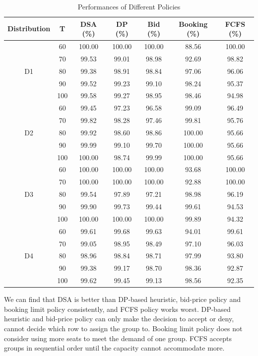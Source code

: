 \begin{table}[h]
  \centering
  \caption{Performances of Different Policies}
  \begin{tabular}{|c|c|c|c|c|c|c|}
  \hline
  Distribution & T & DSA (\%) & DP (\%) & Bid (\%) & Booking (\%) & FCFS (\%) \\
  \hline
  \multirow{5}{*}{D1} & 60 & 100.00 & 100.00 & 100.00 & 88.56 & 100.00 \\
  & 70    & 99.53 & 99.01 & 98.98 & 92.69 & 98.82 \\
  & 80    & 99.38 & 98.91 & 98.84 & 97.06 & 96.06 \\
  & 90    & 99.52 & 99.23 & 99.10 & 98.24 & 95.37 \\
  & 100   & 99.58 & 99.27 & 98.95 & 98.46 & 94.98 \\
  \hline
  \multirow{5}{*}{D2} & 60  & 99.45 & 97.23 & 96.58 & 99.09 & 96.49 \\
     & 70   & 99.82 & 98.28 & 97.46 & 99.81 & 95.76 \\
     & 80   & 99.92 & 98.60 & 98.86 & 100.00 & 95.66 \\
     & 90   & 99.99 & 99.10 & 99.70 & 100.00 & 95.66 \\
     & 100  & 100.00 & 98.74 & 99.99 & 100.00 & 95.66 \\
  \hline
  \multirow{5}{*}{D3} & 60  & 100.00 & 100.00 & 100.00 & 93.68 & 100.00 \\
     & 70  & 100.00 & 100.00 & 100.00 & 92.88 & 100.00 \\
     & 80  & 99.54 & 97.89 & 97.21 & 98.98 & 96.19 \\
     & 90  & 99.90 & 99.73 & 99.44 & 99.61 & 94.53 \\
     & 100 & 100.00 & 100.00 & 100.00 & 99.89 & 94.32 \\
  \hline
    \multirow{5}{*}{D4} & 60  & 99.61 & 99.68 & 99.63 & 94.01 & 99.61 \\
     & 70  & 99.05 & 98.95 & 98.49 & 97.10 & 96.03 \\
     & 80  & 98.96 & 98.84 & 98.71 & 97.99 & 93.80 \\
     & 90  & 99.38 & 99.17 & 98.70 & 98.36 & 92.87 \\
     & 100 & 99.62 & 99.45 & 99.13 & 98.56 & 92.35 \\
  \hline
  \end{tabular}
\end{table}

We can find that DSA is better than DP-based heuristic, bid-price policy and booking limit policy consistently, and FCFS policy works worst. DP-based heuristic and bid-price policy can only make the decision to accept or deny, cannot decide which row to assign the group to. Booking limit policy does not consider using more seats to meet the demand of one group. FCFS accepts groups in sequential order until the capacity cannot accommodate more.

